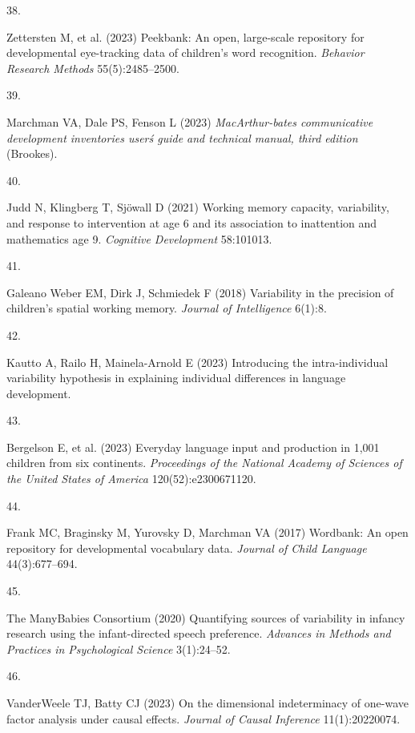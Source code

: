 \documentclass[9pt,twocolumn,twoside,]{pnas-new}
\newlength{\cslhangindent}
\newlength{\csllabelwidth}
\newenvironment{CSLReferences}[2] %
 {\begin{list}{}{%
  \setlength{\itemindent}{0pt}
  \setlength{\leftmargin}{0pt}
  \setlength{\parsep}{0pt}
  \ifodd #1
   \setlength{\leftmargin}{\cslhangindent}
   \setlength{\itemindent}{-1\cslhangindent}
  \fi
  \setlength{\itemsep}{#2\baselineskip}}}
 {\end{list}}
\newcommand{\CSLLeftMargin}[1]{\parbox[t]{\csllabelwidth}{#1}}
\newcommand{\CSLRightInline}[1]{\parbox[t]{\linewidth - \csllabelwidth}{#1}\break}
\begin{document}
\begin{CSLReferences}{0}{1}
\CSLLeftMargin{38. }%
\CSLRightInline{Zettersten M, et al. (2023) Peekbank: An open,
large-scale repository for developmental eye-tracking data of children's
word recognition. \emph{Behavior Research Methods} 55(5):2485--2500.}

\CSLLeftMargin{39. }%
\CSLRightInline{Marchman VA, Dale PS, Fenson L (2023)
\emph{MacArthur-bates communicative development inventories userś guide
and technical manual, third edition} (Brookes).}

\CSLLeftMargin{40. }%
\CSLRightInline{Judd N, Klingberg T, Sjöwall D (2021) Working memory
capacity, variability, and response to intervention at age 6 and its
association to inattention and mathematics age 9. \emph{Cognitive
Development} 58:101013.}

\CSLLeftMargin{41. }%
\CSLRightInline{Galeano Weber EM, Dirk J, Schmiedek F (2018) Variability
in the precision of children's spatial working memory. \emph{Journal of
Intelligence} 6(1):8.}

\CSLLeftMargin{42. }%
\CSLRightInline{Kautto A, Railo H, Mainela-Arnold E (2023) Introducing
the intra-individual variability hypothesis in explaining individual
differences in language development.}

\CSLLeftMargin{43. }%
\CSLRightInline{Bergelson E, et al. (2023) Everyday language input and
production in 1,001 children from six continents. \emph{Proceedings of
the National Academy of Sciences of the United States of America}
120(52):e2300671120.}

\CSLLeftMargin{44. }%
\CSLRightInline{Frank MC, Braginsky M, Yurovsky D, Marchman VA (2017)
{Wordbank: An open repository for developmental vocabulary data}.
\emph{Journal of Child Language} 44(3):677--694.}

\CSLLeftMargin{45. }%
\CSLRightInline{The ManyBabies Consortium (2020) {Quantifying sources of
variability in infancy research using the infant-directed speech
preference}. \emph{Advances in Methods and Practices in Psychological
Science} 3(1):24--52.}

\CSLLeftMargin{46. }%
\CSLRightInline{VanderWeele TJ, Batty CJ (2023) On the dimensional
indeterminacy of one-wave factor analysis under causal effects.
\emph{Journal of Causal Inference} 11(1):20220074.}

\end{CSLReferences}



% 
\end{document}
